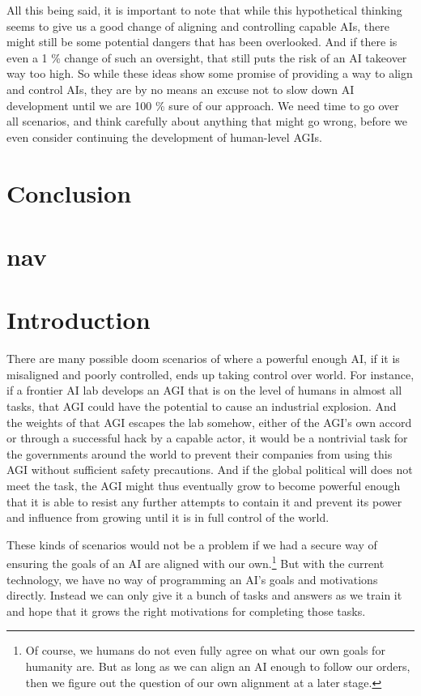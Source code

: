 \documentclass{article}
\begin{document}
All this being said, it is important to note that while this hypothetical thinking seems to give us a good change of aligning and controlling capable AIs, there might still be some potential dangers that has been overlooked. And if there is even a 1 \% change of such an oversight, that still puts the risk of an AI takeover way too high. So while these ideas show some promise of providing a way to align and control AIs, they are by no means an excuse not to slow down AI development until we are 100 \% sure of our approach. We need time to go over all scenarios, and think carefully about anything that might go wrong, before we even consider continuing the development of human-level AGIs.



\section{Conclusion}









\section*{nav}
\newpage

\section{Introduction}

There are many possible doom scenarios of where a powerful enough AI, if it is misaligned and poorly controlled, ends up taking control over world. For instance, if a frontier AI lab develops an AGI that is on the level of humans in almost all tasks, that AGI could have the potential to cause an industrial explosion. And the weights of that AGI escapes the lab somehow, either of the AGI's own accord or through a successful hack by a capable actor, it would be a nontrivial task for the governments around the world to prevent their companies from using this AGI without sufficient safety precautions. And if the global political will does not meet the task, the AGI might thus eventually grow to become powerful enough that it is able to resist any further attempts to contain it and prevent its power and influence from growing until it is in full control of the world.

These kinds of scenarios would not be a problem if we had a secure way of ensuring the goals of an AI are aligned with our own.\footnote{Of course, we humans do not even fully agree on what our own goals for humanity are. But as long as we can align an AI enough to follow our orders, then we figure out the question of our own alignment at a later stage.}
But with the current technology, we have no way of programming an AI's goals and motivations directly. Instead we can only give it a bunch of tasks and answers as we train it and hope that it grows the right motivations for completing those tasks.
\end{document}
